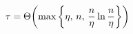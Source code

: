 \documentclass[preview]{standalone}
\begin{document}
\begin{align*}
\special{dvisvgm:raw <g id='unique000'>}\tau = \Theta\!\left(\max\left\{\eta,\,n,\,\frac{n}{\eta}\ln\frac{n}{\eta}\right\}\right)\special{dvisvgm:raw </g>}
\end{align*}
\end{document}
